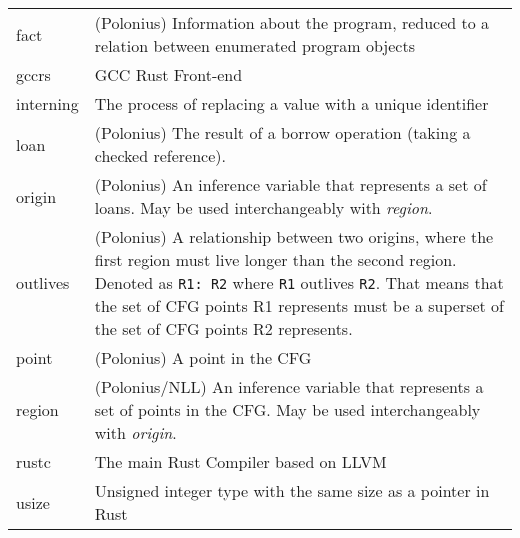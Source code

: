 \documentclass[
  11pt,
  twoside,symmetric]{report}
\begin{document}
\begin{longtable}[]{@{}
  >{\raggedright\arraybackslash}p{}
  >{\raggedright\arraybackslash}p{}@{}}
fact & (Polonius) Information about the program, reduced to a relation
between enumerated program objects \\
gccrs & GCC Rust Front-end \\
interning & The process of replacing a value with a unique identifier \\
loan & (Polonius) The result of a borrow operation (taking a checked
reference). \\
origin & (Polonius) An inference variable that represents a set of
loans. May be used interchangeably with \emph{region}. \\
outlives & (Polonius) A relationship between two origins, where the
first region must live longer than the second region. Denoted as
\texttt{R1:\ R2} where \texttt{R1} outlives \texttt{R2}. That means that
the set of CFG points R1 represents must be a superset of the set of CFG
points R2 represents. \\
point & (Polonius) A point in the CFG \\
region & (Polonius/NLL) An inference variable that represents a set of
points in the CFG. May be used interchangeably with \emph{origin}. \\
rustc & The main Rust Compiler based on LLVM \\
usize & Unsigned integer type with the same size as a pointer in Rust \\
\end{longtable}
\end{document}
